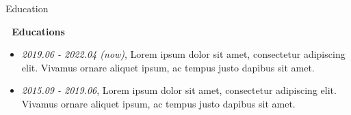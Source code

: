 \begin{section}{Education}
\label{sec:education}

\begin{center}
\huge{\textbf{📖 Educations}}
\end{center}

\begin{itemize}
  \item \textit{2019.06 - 2022.04 (now)}, Lorem ipsum dolor sit amet, consectetur adipiscing elit. Vivamus ornare aliquet ipsum, ac tempus justo dapibus sit amet.
  \item \textit{2015.09 - 2019.06}, Lorem ipsum dolor sit amet, consectetur adipiscing elit. Vivamus ornare aliquet ipsum, ac tempus justo dapibus sit amet.
\end{itemize}
\end{section} 